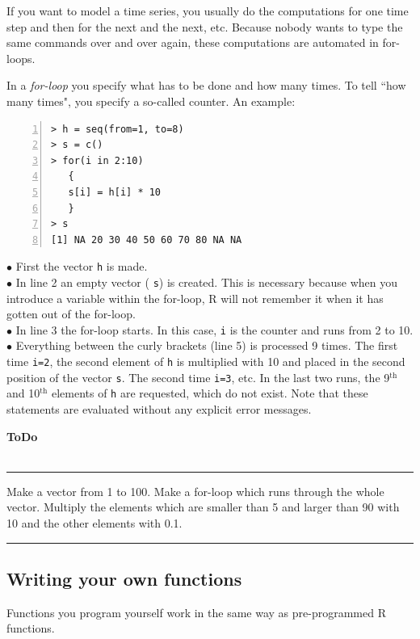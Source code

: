 \documentclass[a4paper,11pt,twocolumn,tablecaptionabove]{scrartcl} %
\newenvironment{ToDo} {%
  \begin{flushright}
    \hfill
    \begin{minipage}{0.95\columnwidth}         %
    \textsf{\textbf{ToDo}} \\
      \vspace{-0.85cm}\\
      {\color{Gray}\rule[-0.1cm]{\columnwidth}{1.5pt}}} { %
      {\color{Gray} \rule[0.3cm]{\columnwidth}{1.5pt}}
    \end{minipage}
    \vspace{1em}
  \end{flushright}
  }
\begin{document}
If you want to model a time series, you usually do the computations for one time step and then for the next and the next, etc. Because nobody wants to type the same commands over and over again, these computations are automated in for-loops. 

In a \emph{for-loop} you specify what has to be done and how many times. To tell ``how many times", you specify a so-called counter. An example:

\begin{Verbatim}[frame=single,numbers=left,gobble=0, xleftmargin=0.35cm, numbersep=0.1cm]
> h = seq(from=1, to=8)
> s = c()
> for(i in 2:10) 
   {
   s[i] = h[i] * 10
   }
> s
[1] NA 20 30 40 50 60 70 80 NA NA
\end{Verbatim}

\noindent $\bullet$ First the vector  \texttt{h} is made.\\
\noindent $\bullet$ In line 2 an empty vector ( \texttt{s}) is created. This is necessary because when you introduce a variable within the for-loop, R will not remember it when it has gotten out of the for-loop.\\
\noindent $\bullet$  In line 3 the for-loop starts. In this case, \texttt{i} is the counter and runs from 2 to 10.\\
\noindent $\bullet$ Everything between the curly brackets (line 5) is processed 9 times. The first time \texttt{i=2}, the second element of \texttt{h} is multiplied with 10 and placed in the second position of the vector \texttt{s}. The second time \texttt{i=3}, etc. In the last two runs, the 9$^\mathrm{th}$ and 10$^\mathrm{th}$ elements of \texttt{h} are requested, which do not exist. Note that these statements are evaluated without any explicit error messages.

\begin{ToDo}
Make a vector from 1 to 100. Make a for-loop which runs through the whole vector. Multiply the elements which are smaller than 5 and larger than 90 with 10 and the other elements with 0.1.
\end{ToDo}

\subsection{Writing your own functions}
\label{sec:progfunc}

Functions you program yourself work in the same way as pre-programmed R functions.
\end{document}
